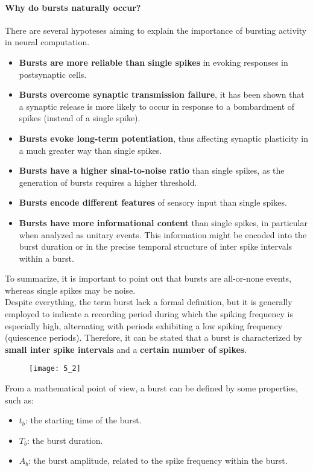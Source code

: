 \paragraph{Why do bursts naturally occur?}
There are several hypoteses aiming to explain the importance of bursting activity in
neural computation.
\begin{itemize}
    \item \textbf{Bursts are more reliable than single spikes} in evoking responses in
    postsynaptic cells.
    \item \textbf{Bursts overcome synaptic transmission failure}, it has been shown
    that a synaptic release is more likely to occur in response to a bombardment
    of spikes (instead of a single spike).
    \item \textbf{Bursts evoke long-term potentiation}, thus affecting synaptic
    plasticity in a much greater way than single spikes.
    \item \textbf{Bursts have a higher sinal-to-noise ratio} than single spikes, as
    the generation of bursts requires a higher threshold.
    \item \textbf{Bursts encode different features} of sensory input than single
    spikes.
    \item \textbf{Bursts have more informational content} than single spikes, in
    particular when analyzed as unitary events. This information might be encoded
    into the burst duration or in the precise temporal structure of inter spike
    intervals within a burst. 
\end{itemize}
To summarize, it is important to point out that bursts are all-or-none events,
whereas single spikes may be noise.\\
Despite everything, the term burst lack a formal definition, but it is generally employed
to indicate a recording period during which the spiking frequency is especially high,
alternating with periods exhibiting a low spiking frequency (quiescence periods). Therefore,
it can be stated that a burst is characterized by \textbf{small inter spike intervals} and a
\textbf{certain number of spikes}.
\begin{figure}[H]
    \texttt{[image: 5\_2]}
    \centering
\end{figure}
From a mathematical point of view, a burst can be defined by some properties, such as:
\begin{itemize}
    \item \(t_b\): the starting time of the burst.
    \item \(T_b\): the burst duration.
    \item \(A_b\): the burst amplitude, related to the spike frequency within the burst.
\end{itemize}
